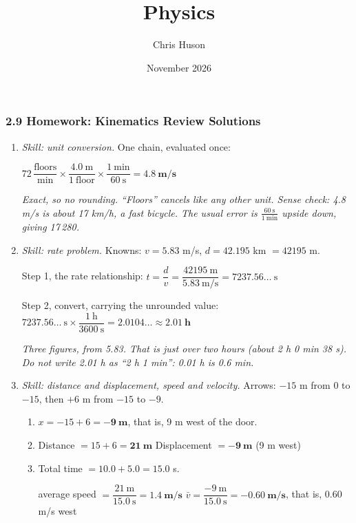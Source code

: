 \documentclass[12pt, twoside]{article}
\title{Physics}
\author{Chris Huson}
\date{November 2026}
\begin{document}
\subsubsection*{2.9 Homework: Kinematics Review Solutions}

\begin{enumerate}[itemsep=0.5cm]

\item \emph{Skill: unit conversion.} One chain, evaluated once:

  $72\,\dfrac{\text{floors}}{\text{min}} \times \dfrac{4.0~\text{m}}{1~\text{floor}}
  \times \dfrac{1~\text{min}}{60~\text{s}} = \mathbf{4.8~\textbf{m/s}}$

  \emph{Exact, so no rounding. ``Floors'' cancels like any other unit. Sense check:
  4.8 m/s is about 17 km/h, a fast bicycle. The usual error is
  $\frac{60~\text{s}}{1~\text{min}}$ upside down, giving 17\,280.}

\item \emph{Skill: rate problem.} Knowns: $v = 5.83$ m/s, $d = 42.195$ km
  $= \num{42195}$ m.

  Step 1, the rate relationship: \quad $t = \dfrac{d}{v} =
  \dfrac{\num{42195}~\text{m}}{5.83~\text{m/s}} = 7237.56\ldots~\text{s}$

  Step 2, convert, carrying the unrounded value: \quad
  $7237.56\ldots~\text{s} \times \dfrac{1~\text{h}}{3600~\text{s}} = 2.0104\ldots
  \approx \mathbf{2.01~\textbf{h}}$

  \emph{Three figures, from 5.83. That is just over two hours (about 2 h 0 min 38 s).
  Do not write 2.01 h as ``2 h 1 min'': 0.01 h is 0.6 min.}

\newpage

\item \emph{Skill: distance and displacement, speed and velocity.} Arrows: $-15$ m
  from 0 to $-15$, then $+6$ m from $-15$ to $-9$.
  \begin{enumerate}[itemsep=0.3cm]
    \item $x = -15 + 6 = \mathbf{-9~\textbf{m}}$, that is, 9 m west of the door.
    \item Distance $= 15 + 6 = \mathbf{21~\textbf{m}}$ \qquad Displacement
      $= \mathbf{-9~\textbf{m}}$ (9 m west)
    \item Total time $= 10.0 + 5.0 = 15.0$ s.

      average speed $= \dfrac{21~\text{m}}{15.0~\text{s}} = \mathbf{1.4~\textbf{m/s}}$
      \qquad
      $\bar{v} = \dfrac{-9~\text{m}}{15.0~\text{s}} = \mathbf{-0.60~\textbf{m/s}}$,
      that is, 0.60 m/s west


\end{enumerate}
\end{enumerate}
\end{document}
